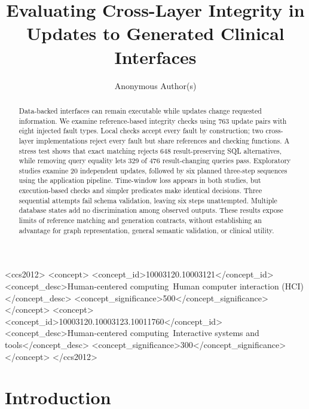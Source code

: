 \documentclass[manuscript,review,anonymous]{acmart}
\title{Evaluating Cross-Layer Integrity in Updates to Generated Clinical Interfaces}
\author{Anonymous Author(s)}
\begin{document}
\begin{abstract}
Data-backed interfaces can remain executable while updates change requested information. We examine reference-based integrity checks using 763 update pairs with eight injected fault types. Local checks accept every fault by construction; two cross-layer implementations reject every fault but share references and checking functions. A stress test shows that exact matching rejects 648 result-preserving SQL alternatives, while removing query equality lets 329 of 476 result-changing queries pass. Exploratory studies examine 20 independent updates, followed by six planned three-step sequences using the application pipeline. Time-window loss appears in both studies, but execution-based checks and simpler predicates make identical decisions. Three sequential attempts fail schema validation, leaving six steps unattempted. Multiple database states add no discrimination among observed outputs. These results expose limits of reference matching and generation contracts, without establishing an advantage for graph representation, general semantic validation, or clinical utility.
\end{abstract}

\begin{CCSXML}
<ccs2012>
  <concept>
    <concept_id>10003120.10003121</concept_id>
    <concept_desc>Human-centered computing~Human computer interaction (HCI)</concept_desc>
    <concept_significance>500</concept_significance>
  </concept>
  <concept>
    <concept_id>10003120.10003123.10011760</concept_id>
    <concept_desc>Human-centered computing~Interactive systems and tools</concept_desc>
    <concept_significance>300</concept_significance>
  </concept>
</ccs2012>
\end{CCSXML}



\maketitle

\section{Introduction}
\end{document}

